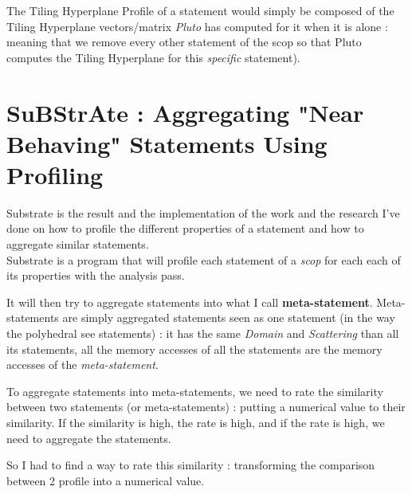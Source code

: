 \documentclass[paper=a4, fontsize=11.5pt]{scrartcl}
\numberwithin{equation}{section}        %
\numberwithin{figure}{section}          %
\numberwithin{table}{section}               %
\begin{document}
        The Tiling Hyperplane Profile of a statement would simply be composed
        of the Tiling Hyperplane vectors/matrix \textit{Pluto} has computed for
        it when it is alone : meaning that we remove every other
        statement of the scop so that Pluto computes the Tiling Hyperplane for this \textit{specific}
        statement).



\section{SuBStrAte : Aggregating "Near Behaving" Statements Using Profiling}
    Substrate is the result and the implementation of the work and the research I've done
    on how to profile the different properties of a statement and how to aggregate similar
    statements.\\
    Substrate is a program that will profile each statement of a \textit{scop} for
    each each of its properties with the analysis pass.

    It will then try to aggregate
    statements into what I call \textbf{meta-statement}. Meta-statements are simply
    aggregated statements seen as one statement (in the way the polyhedral see statements)
    : it has the same \textit{Domain} and \textit{Scattering} than all its statements,
    all the memory accesses of all the statements are the memory accesses of the \textit{meta-statement}.

    To aggregate statements into meta-statements, we need to rate the similarity between two
    statements (or meta-statements) : putting a numerical value to their similarity.
    If the similarity is high, the rate is high, and if the rate is high, we need to
    aggregate the statements.

    So I had to find a way to rate this similarity : transforming the comparison between
    2 profile into a numerical value.
\end{document}
